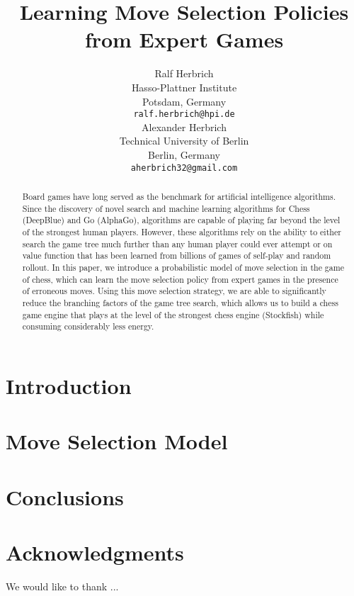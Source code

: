 \documentclass{article}
\newcommand{\eat}[1]{#1}
\begin{document}
\title{Learning Move Selection Policies from Expert Games}

\eat{
\author{Ralf Herbrich \\
Hasso-Plattner Institute \\
Potsdam, Germany \\
\texttt{ralf.herbrich@hpi.de} \\ 
\And
Alexander Herbrich \\
Technical University of Berlin \\
Berlin, Germany \\
\texttt{aherbrich32@gmail.com}
}
}

\maketitle

\begin{abstract}
Board games have long served as the benchmark for artificial intelligence algorithms. Since the discovery of novel search and machine learning algorithms for Chess (DeepBlue) and Go (AlphaGo), algorithms are capable of playing far beyond the level of the strongest human players. However, these algorithms rely on the ability to either search the game tree much further than any human player could ever attempt or on value function that has been learned from billions of games of self-play and random rollout. In this paper, we introduce a probabilistic model of move selection in the game of chess, which can learn the move selection policy from expert games in the presence of erroneous moves. Using this move selection strategy, we are able to significantly reduce the branching factors of the game tree search, which allows us to build a chess game engine that plays at the level of the strongest chess engine (Stockfish) while consuming considerably less energy.
\end{abstract}

\section{Introduction}


\section{Move Selection Model}


\section{Conclusions}

\section*{Acknowledgments}
We would like to thank ...

\appendix



\end{document}
